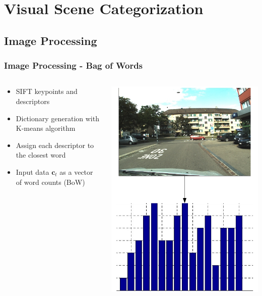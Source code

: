\documentclass{beamer}
\begin{document}
\section{Visual Scene Categorization}
\subsection{Image Processing}
\begin{frame}[t]
  \frametitle{Image Processing - Bag of Words}
  \begin{columns}[c]
    \begin{column}{5cm}
      \begin{itemize}
        \item SIFT keypoints and descriptors
        \item Dictionary generation with K-means algorithm
        \item Assign each descriptor to the closest word
        \item Input data $\mathbf{c}_t$ as a vector of word counts (BoW)
      \end{itemize}
    \end{column}
    \begin{column}{5cm}
      \includegraphics[scale=0.22]{figures/bow}
    \end{column}
  \end{columns}
\end{frame}
\end{document}
